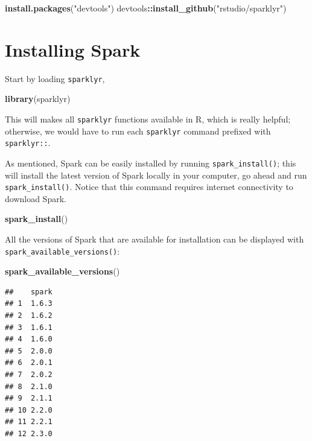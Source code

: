 \documentclass[]{book}
\newenvironment{Shaded}{\begin{snugshade}}{\end{snugshade}}
\newcommand{\KeywordTok}[1]{\textcolor[rgb]{0.13,0.29,0.53}{\textbf{#1}}}
\newcommand{\NormalTok}[1]{#1}
\newcommand{\OperatorTok}[1]{\textcolor[rgb]{0.81,0.36,0.00}{\textbf{#1}}}
\newcommand{\StringTok}[1]{\textcolor[rgb]{0.31,0.60,0.02}{#1}}
\theoremstyle{definition}
\theoremstyle{definition}
\theoremstyle{definition}
\theoremstyle{remark}
\begin{document}
\begin{Shaded}
\begin{Highlighting}[]
\KeywordTok{install.packages}\NormalTok{(}\StringTok{"devtools"}\NormalTok{)}
\NormalTok{devtools}\OperatorTok{::}\KeywordTok{install_github}\NormalTok{(}\StringTok{"rstudio/sparklyr"}\NormalTok{)}
\end{Highlighting}
\end{Shaded}

\hypertarget{installing-spark}{%
\section{Installing Spark}\label{installing-spark}}

Start by loading \texttt{sparklyr},

\begin{Shaded}
\begin{Highlighting}[]
\KeywordTok{library}\NormalTok{(sparklyr)}
\end{Highlighting}
\end{Shaded}

This will makes all \texttt{sparklyr} functions available in R, which is
really helpful; otherwise, we would have to run each \texttt{sparklyr}
command prefixed with \texttt{sparklyr::}.

As mentioned, Spark can be easily installed by running
\texttt{spark\_install()}; this will install the latest version of Spark
locally in your computer, go ahead and run \texttt{spark\_install()}.
Notice that this command requires internet connectivity to download
Spark.

\begin{Shaded}
\begin{Highlighting}[]
\KeywordTok{spark_install}\NormalTok{()}
\end{Highlighting}
\end{Shaded}

All the versions of Spark that are available for installation can be
displayed with \texttt{spark\_available\_versions()}:

\begin{Shaded}
\begin{Highlighting}[]
\KeywordTok{spark_available_versions}\NormalTok{()}
\end{Highlighting}
\end{Shaded}

\begin{verbatim}
##    spark
## 1  1.6.3
## 2  1.6.2
## 3  1.6.1
## 4  1.6.0
## 5  2.0.0
## 6  2.0.1
## 7  2.0.2
## 8  2.1.0
## 9  2.1.1
## 10 2.2.0
## 11 2.2.1
## 12 2.3.0
\end{verbatim}
\end{document}
